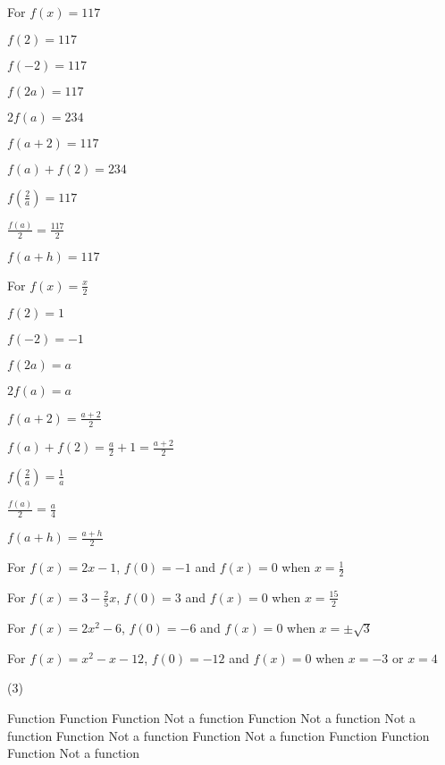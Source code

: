 \begin{tasks}
\task For $f(x) = 117$

\begin{shortitemize}
\item  $f(2) = 117$
\item  $f(-2) = 117$
\item  $f(2a) = 117$
\item  $2 f(a) = 234$
\item $f(a+2) = 117$
\item $f(a) + f(2) = 234$
\item  $f \left( \frac{2}{a} \right) = 117$ 
\item $\frac{f(a)}{2} = \frac{117}{2}$
\item  $f(a + h) = 117$
\end{shortitemize}

\task For $f(x) = \frac{x}{2}$

\begin{shortitemize}
\item  $f(2) = 1$
\item  $f(-2) = -1$
\item  $f(2a) = a$
\item  $2 f(a) = a$
\item $f(a+2) = \frac{a+2}{2}$
\item $f(a) + f(2) = \frac{a}{2}+ 1 = \frac{a+2}{2}$
\item  $f \left( \frac{2}{a} \right) = \frac{1}{a}$
\item $\frac{f(a)}{2} =  \frac{a}{4}$
\item  $f(a + h) = \frac{a+h}{2}$
\end{shortitemize}

\task For $f(x) = 2x-1$,  $f(0) = -1$ and $f(x) = 0$ when $x = \frac{1}{2}$

\task For $f(x) =  3 - \frac{2}{5} x$, $f(0) = 3$ and $f(x) = 0$ when $x = \frac{15}{2}$

\task For $f(x) =  2x^2-6$, $f(0) = -6$ and $f(x) = 0$ when $x = \pm \sqrt{3}$

\task For $f(x) =  x^2-x-12$, $f(0) = -12$ and $f(x) = 0$ when $x = -3$ or $x=4$

\end{tasks}

\begin{tasks}[resume](3)

\task Function
\task Function
\task Function
\task Not a function
\task Function
\task Not a function
\task  Not a function
\task  Function
\task  Not a function
\task   Function
\task   Not a function
\task Function
\task Function
\task  Function
\task Not a function

\end{tasks}

